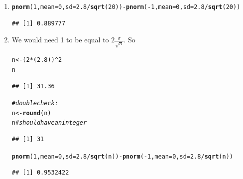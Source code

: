 \documentclass[twoside]{book}\usepackage[]{graphicx}\usepackage[]{xcolor}
\makeatletter
\newcommand{\hlnum}[1]{\textcolor[rgb]{0.686,0.059,0.569}{#1}}%
\newcommand{\hlcom}[1]{\textcolor[rgb]{0.678,0.584,0.686}{\textit{#1}}}%
\newcommand{\hlopt}[1]{\textcolor[rgb]{0,0,0}{#1}}%
\newcommand{\hlstd}[1]{\textcolor[rgb]{0.345,0.345,0.345}{#1}}%
\newcommand{\hlkwb}[1]{\textcolor[rgb]{0.69,0.353,0.396}{#1}}%
\newcommand{\hlkwc}[1]{\textcolor[rgb]{0.333,0.667,0.333}{#1}}%
\newcommand{\hlkwd}[1]{\textcolor[rgb]{0.737,0.353,0.396}{\textbf{#1}}}%
\newenvironment{kframe}{%
 \def\at@end@of@kframe{}%
 \ifinner\ifhmode%
  \def\at@end@of@kframe{\end{minipage}}%
  \begin{minipage}{\columnwidth}%
 \fi\fi%
 \def\FrameCommand##1{\hskip\@totalleftmargin \hskip-\fboxsep
 \colorbox{shadecolor}{##1}\hskip-\fboxsep
     \hskip-\linewidth \hskip-\@totalleftmargin \hskip\columnwidth}%
 \MakeFramed {\advance\hsize-\width
   \@totalleftmargin\z@ \linewidth\hsize
   \@setminipage}}%
 {\par\unskip\endMakeFramed%
 \at@end@of@kframe}
\newenvironment{knitrout}{}{} %
\makeatother
\begin{document}
\begin{solution}
	\begin{enumerate}
		 \item
\begin{knitrout}
\color{fgcolor}\begin{kframe}
\begin{alltt}
\hlkwd{pnorm}\hlstd{(}\hlnum{1}\hlstd{,} \hlkwc{mean} \hlstd{=} \hlnum{0}\hlstd{,} \hlkwc{sd} \hlstd{=} \hlnum{2.8}\hlopt{/}\hlkwd{sqrt}\hlstd{(}\hlnum{20}\hlstd{))} \hlopt{-} \hlkwd{pnorm}\hlstd{(}\hlopt{-}\hlnum{1}\hlstd{,} \hlkwc{mean} \hlstd{=} \hlnum{0}\hlstd{,} \hlkwc{sd} \hlstd{=} \hlnum{2.8}\hlopt{/}\hlkwd{sqrt}\hlstd{(}\hlnum{20}\hlstd{))}
\end{alltt}
\begin{verbatim}
## [1] 0.889777
\end{verbatim}
\end{kframe}
\end{knitrout}
		 \item
			 We would need 1 to be equal to $2 \frac{\sigma}{\sqrt n}$. So
\begin{knitrout}
\color{fgcolor}\begin{kframe}
\begin{alltt}
\hlstd{n} \hlkwb{<-} \hlstd{(}\hlnum{2} \hlopt{*} \hlstd{(}\hlnum{2.8}\hlstd{))}\hlopt{^}\hlnum{2}
\hlstd{n}
\end{alltt}
\begin{verbatim}
## [1] 31.36
\end{verbatim}
\begin{alltt}
\hlcom{# double check:}
\hlstd{n} \hlkwb{<-} \hlkwd{round}\hlstd{(n)}
\hlstd{n}  \hlcom{# should have an integer}
\end{alltt}
\begin{verbatim}
## [1] 31
\end{verbatim}
\begin{alltt}
\hlkwd{pnorm}\hlstd{(}\hlnum{1}\hlstd{,} \hlkwc{mean} \hlstd{=} \hlnum{0}\hlstd{,} \hlkwc{sd} \hlstd{=} \hlnum{2.8}\hlopt{/}\hlkwd{sqrt}\hlstd{(n))} \hlopt{-} \hlkwd{pnorm}\hlstd{(}\hlopt{-}\hlnum{1}\hlstd{,} \hlkwc{mean} \hlstd{=} \hlnum{0}\hlstd{,} \hlkwc{sd} \hlstd{=} \hlnum{2.8}\hlopt{/}\hlkwd{sqrt}\hlstd{(n))}
\end{alltt}
\begin{verbatim}
## [1] 0.9532422
\end{verbatim}
\end{kframe}
\end{knitrout}


\end{enumerate}
\end{solution}
\end{document}
